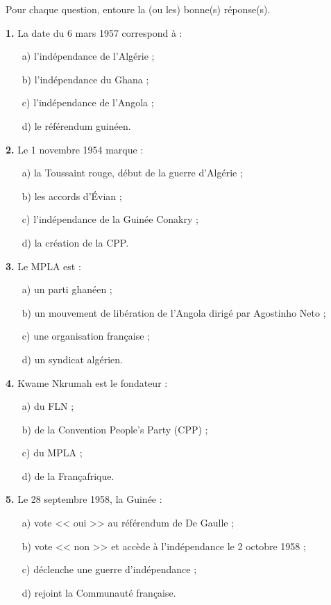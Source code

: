 \documentclass[11pt]{article}
\newcommand{\cle}[1]{{\popxbold\color{popdark}#1}}
\begin{document}
\begin{exercice}
Pour chaque question, entoure la (ou les) bonne(s) réponse(s).

\textbf{1.} La date du \cle{6 mars 1957} correspond à :
\begin{itemize}
\item[a)] l'indépendance de l'Algérie ;
\item[b)] l'indépendance du Ghana ;
\item[c)] l'indépendance de l'Angola ;
\item[d)] le référendum guinéen.
\end{itemize}

\textbf{2.} Le \cle{1\ier{} novembre 1954} marque :
\begin{itemize}
\item[a)] la Toussaint rouge, début de la guerre d'Algérie ;
\item[b)] les accords d'Évian ;
\item[c)] l'indépendance de la Guinée Conakry ;
\item[d)] la création de la CPP.
\end{itemize}

\textbf{3.} Le \cle{MPLA} est :
\begin{itemize}
\item[a)] un parti ghanéen ;
\item[b)] un mouvement de libération de l'Angola dirigé par Agostinho Neto ;
\item[c)] une organisation française ;
\item[d)] un syndicat algérien.
\end{itemize}

\textbf{4.} Kwame Nkrumah est le fondateur :
\begin{itemize}
\item[a)] du FLN ;
\item[b)] de la Convention People's Party (CPP) ;
\item[c)] du MPLA ;
\item[d)] de la Françafrique.
\end{itemize}

\textbf{5.} Le \cle{28 septembre 1958}, la Guinée :
\begin{itemize}
\item[a)] vote << oui >> au référendum de De Gaulle ;
\item[b)] vote << non >> et accède à l'indépendance le 2 octobre 1958 ;
\item[c)] déclenche une guerre d'indépendance ;
\item[d)] rejoint la Communauté française.
\end{itemize}
\end{exercice}
\end{document}
